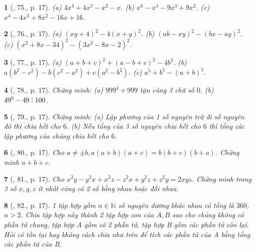 \documentclass{article}
\newtheorem{baitoan}{}
\DeclareRobustCommand{\divby}{%
	\mathrel{\vbox{\baselineskip.65ex\lineskiplimit0pt\hbox{.}\hbox{.}\hbox{.}}}%
}
\begin{document}
\begin{baitoan}[\cite{Tuyen_Toan_8}, 75., p. 17]
	(a) $4x^4 + 4x^3 - x^2 - x$. (b) $x^6 - x^4 - 9x^3 + 9x^2$. (c) $x^4 - 4x^3 + 8x^2 - 16x + 16$.
\end{baitoan}

\begin{baitoan}[\cite{Tuyen_Toan_8}, 76., p. 17]
	(a) $(xy + 4)^2 - 4(x + y)^2$. (b) $(ab - xy)^2 - (bx - ay)^2$. (c) $(x^2 + 8x - 34)^2 - (3x^2 - 8x - 2)^2$.
\end{baitoan}

\begin{baitoan}[\cite{Tuyen_Toan_8}, 77., p. 17]
	(a) $(a + b + c)^2 + (a - b + c)^2 - 4b^2$. (b) $a(b^2 - c^2) - b(c^2 - a^2) + c(a^2 - b^2)$. (c) $a^5 + b^5 - (a + b)^5$.
\end{baitoan}

\begin{baitoan}[\cite{Tuyen_Toan_8}, 78., p. 17]
	Chứng minh: (a) $999^4 + 999$ tận cùng 3 chữ số $0$. (b) $49^5 - 49\divby100$.
\end{baitoan}

\begin{baitoan}[\cite{Tuyen_Toan_8}, 79., p. 17]
	Chứng minh: (a) Lập phương của 1 số nguyên trừ đi số nguyên đó thì chia hết cho $6$. (b) Nếu tổng của 3 số nguyên chia hết cho $6$ thì tổng các lập phương của chúng chia hết cho $6$.
\end{baitoan}

\begin{baitoan}[\cite{Tuyen_Toan_8}, 80., p. 17]
	Cho $a\ne\pm b,a(a + b)(a + c) = b(b + c)(b + a)$. Chứng minh $a + b + c$.
\end{baitoan}

\begin{baitoan}[\cite{Tuyen_Toan_8}, 81., p. 17]
	Cho $x^2y - y^2x + x^2z - z^2x + y^2z + z^2y = 2xyz$. Chứng minh trong 3 số $x,y,z$ ít nhất cũng có 2 số bằng nhau hoặc đối nhau.
\end{baitoan}

\begin{baitoan}[\cite{Tuyen_Toan_8}, 82., p. 17]
	1 tập hợp gồm $n\in\mathbb{N}$ số nguyên dương khác nhau có tổng là $360$, $n > 2$. Chia tập hợp này thành 2 tập hợp con của $A,B$ sao cho chúng không có phần tử chung, tập hợp A gồm có 2 phần tử, tập hợp B gồm các phần tử còn lại. Hỏi có tồn tại hay không cách chia như trên để tích các phần tử của A bằng tổng các phần tử của B.
\end{baitoan}
\end{document}
